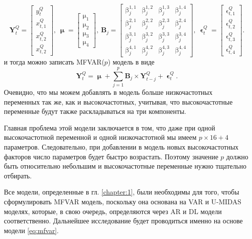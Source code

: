 \documentclass[a4paper, 14pt]{extreport}
\numberwithin{equation}{section}
\renewcommand{\beta}{\upbeta}
\renewcommand{\epsilon}{\upvarepsilon}
\renewcommand{\mu}{\upmu}
\numberwithin{equation}{section}
\begin{document}
	\begin{equation*}
		\mathbf Y_t^Q = \begin{bmatrix}
			y_t^Q \\[2ex] x_{t,1}^Q \\[2ex] x_{t,2}^Q \\[2ex] x_{t,2}^Q
		\end{bmatrix},\ 
		\mathbf \mu = \begin{bmatrix}
		\mu_1 \\[2ex] \mu_2 \\[2ex] \mu_3 \\[2ex] \mu_4
		\end{bmatrix},\ 
		\mathbf B_j = \begin{bmatrix}
		\beta_j^{1,1} & \beta_j^{1,2} & \beta_j^{1,3} & \beta_j^{1,4} \\[2ex] 
		\beta_j^{2,1} & \beta_j^{2,2} & \beta_j^{2,3} & \beta_j^{2,4} \\[2ex] 
		\beta_j^{3,1} & \beta_j^{3,2} & \beta_j^{3,3} & \beta_j^{3,4} \\[2ex] 
		\beta_j^{4,1} & \beta_j^{4,2} & \beta_j^{4,3} & \beta_j^{4,4}
		\end{bmatrix},\
		\mathbf \epsilon_{t}^Q = \begin{bmatrix}
			\epsilon_{t,1}^Q \\[2ex] \epsilon_{t,2}^Q \\[2ex] \epsilon_{t,3}^Q \\[2ex] \epsilon_{t,4}^Q
		\end{bmatrix}.
	\end{equation*}
	и тогда можно записать MFVAR($p$) модель в виде
	\begin{equation}
		\label{eq:mfvar}
		\mathbf Y_t^Q = \mathbf \mu + \sum_{j=1}^{p}\mathbf B_j \times \mathbf Y_{t-j}^Q + \mathbf \epsilon_t^Q.
	\end{equation}
	Очевидно, что мы можем добавлять в модель больше низкочастотных переменных так же, как и высокочастотных, учитывая, что высокочастотные переменные будут также раскладываться на три компоненты.
	
	Главная проблема этой модели заключается в том, что даже при одной высокочастотной переменной и одной низкочастотной мы имеем $p\times16 + 4$ параметров. Следовательно, при добавлении в модель новых высокочастотных факторов число параметров будет быстро возрастать. Поэтому значение $p$ должно быть относительно небольшим и высокочастотные переменные нужно тщательно отбирать.
	
	Все модели, определенные в гл. \ref{chapter:1}, были необходимы для того, чтобы сформулировать MFVAR модель, поскольку она основана на VAR и U-MIDAS моделях, которые, в свою очередь, определяются через AR и DL модели соответственно. Дальнейшее исследование будет проводиться именно на основе модели \ref{eq:mfvar}. 
	
\end{document}
